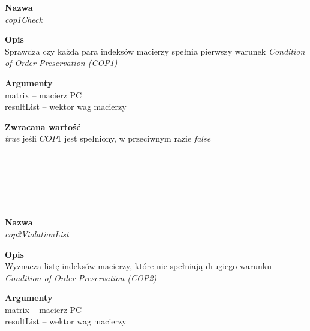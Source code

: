 \begin{spacing}{1.1}
\begin{spacing}{1.1}
\begin{spacing}{1.1}
\begin{spacing}{1.2}
\textbf{Nazwa}\\  \emph{cop1Check} \\ \begin{spacing}{0.3}  \end{spacing}
 
\textbf{Opis}\\ Sprawdza czy każda para indeksów macierzy spełnia pierwszy warunek \textit{Condition of Order Preservation (COP1)} \\  \begin{spacing}{0.3}  \end{spacing}
 
\textbf{Argumenty} \\
matrix -- macierz PC \\  
resultList -- wektor wag macierzy \\  \begin{spacing}{0.3}  \end{spacing}

\textbf{Zwracana wartość}\\ \textit{true} jeśli $COP1$ jest spełniony, w przeciwnym razie \textit{false}\\ \begin{spacing}{0.3}  \end{spacing}\\
 

\\~\\
\begin{spacing}{1.1}
 \\ \begin{spacing}{0.5}  \end{spacing}

\textbf{Nazwa}\\  \emph{cop2ViolationList} \\ \begin{spacing}{0.3}  \end{spacing}
 
\textbf{Opis}\\ Wyznacza listę indeksów macierzy, które nie spełniają drugiego warunku \textit{Condition of Order Preservation (COP2)} \\  \begin{spacing}{0.3}  \end{spacing}
 
\textbf{Argumenty} \\
matrix -- macierz PC \\ 
resultList -- wektor wag macierzy \\  \begin{spacing}{0.3}  \end{spacing}


\end{spacing}
\end{spacing}
\end{spacing}
\end{spacing}
\end{spacing}
